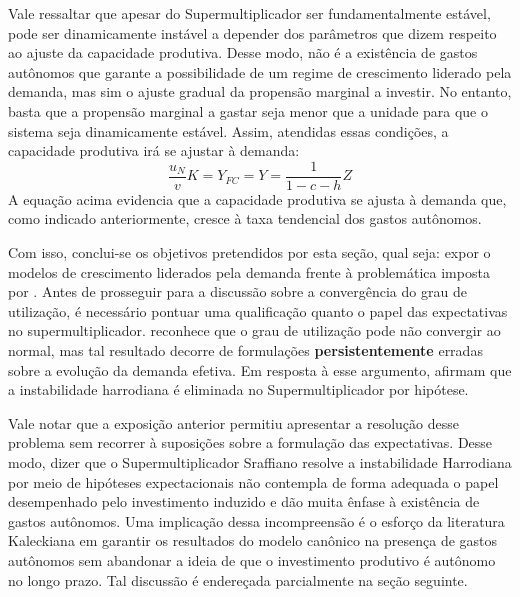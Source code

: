 Vale ressaltar que apesar do Supermultiplicador ser fundamentalmente estável, pode ser dinamicamente instável a depender dos parâmetros que dizem respeito ao ajuste da capacidade produtiva. Desse modo, não é a existência de gastos autônomos que garante a possibilidade de um regime de crescimento liderado pela demanda, mas sim o ajuste gradual da propensão marginal a investir. No entanto, basta que a propensão marginal a gastar seja menor que a unidade para que o sistema seja dinamicamente estável. Assim, atendidas essas condições, a capacidade produtiva irá se ajustar à demanda:
$$
 \frac{u_N}{v}K = Y_{FC} = Y = \frac{1}{1 - c - h}Z
$$
A equação acima evidencia que a capacidade produtiva se ajusta à demanda que, como indicado anteriormente, cresce à taxa tendencial dos gastos autônomos.

Com isso, conclui-se os objetivos pretendidos por esta seção, qual seja: expor o modelos de crescimento liderados pela demanda frente à problemática imposta por \textcite{harrod_essay_1939}. Antes de prosseguir para a discussão sobre a convergência do grau de utilização, é necessário pontuar uma qualificação quanto o papel das expectativas no supermultiplicador. \textcite[p.~87]{serrano_long_1995} reconhece que o grau de utilização pode não convergir ao normal, mas tal resultado decorre de formulações \textbf{persistentemente} erradas sobre a evolução da demanda efetiva. Em resposta à esse argumento, \textcites{allain_macroeconomic_2014}{palley_economics_2018} afirmam que a instabilidade harrodiana é eliminada no Supermultiplicador por hipótese.

Vale notar que a exposição anterior permitiu apresentar a resolução desse problema sem recorrer à suposições sobre a formulação das expectativas. Desse modo, dizer que o Supermultiplicador Sraffiano resolve a instabilidade Harrodiana por meio de hipóteses expectacionais não contempla de forma adequada o papel desempenhado pelo investimento induzido e dão muita ênfase à existência de gastos autônomos. Uma implicação dessa incompreensão é o esforço da literatura Kaleckiana em garantir os resultados do modelo canônico na presença de gastos autônomos sem abandonar a ideia de que o investimento produtivo é autônomo no longo prazo. Tal discussão é endereçada parcialmente na seção seguinte.
